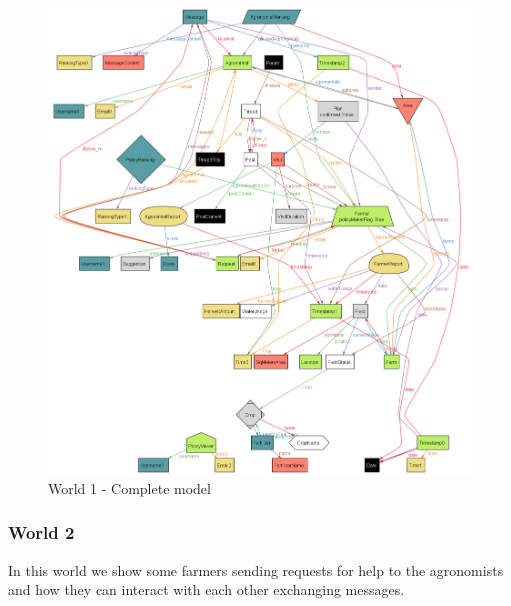 \begin{figure}[H]
\centering
\includegraphics[width=\textwidth]{../AlloyCode/ExportWorldPNG/world1_all.png}
\caption{\label{fig:alloyExecution}World 1 - Complete model}
\end{figure}

\subsubsection{World 2}
In this world we show some farmers sending requests for help to the agronomists and how they can interact with each other exchanging messages.

